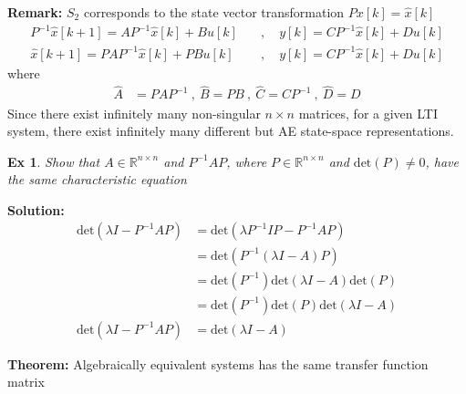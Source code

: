 \documentclass[twoside]{article}
\newtheorem{exmp}[theorem]{Ex}
\begin{document}
\textbf{Remark:} $S_2$ corresponds to the state vector transformation $ P x[k] = \hat{x}[k]$
%
\begin{align*}
  P^{-1} \hat{x}[k+1] = A P^{-1} \hat{x}[k] + B u[k] 
\quad &, \quad y[k] = C P^{-1} \hat{x}[k] + D u[k]
\\
  \hat{x}[k+1] = P A P^{-1} \hat{x}[k] + P B u[k] 
\quad &, \quad y[k] = C P^{-1} \hat{x}[k] + D u[k]
\end{align*}
%
where
%
\begin{align*}
\hat{A} &= P  A P^{-1} \ , \ \hat{B} = P  B \ , \ \hat{C} = C P^{-1} \ ,   \ \hat{D} = D
\end{align*}
%
Since there exist infinitely many non-singular $n \times n$
matrices, for a given LTI system, there exist infinitely 
many different but AE  state-space representations.

\vspace{12pt}

\begin{exmp}
Show that $A \in \mathbb{R}^{n \times n}$ and $P^{-1} A P$, where $P \in \mathbb{R}^{n \times n}$ and $\mathrm{det}(P) \neq 0$, have the same characteristic equation
\end{exmp}

\textbf{Solution:} 
\begin{align*}
  \mathrm{det}\left(\lambda I - P^{-1} A P \right) &= 
\mathrm{det}\left( \lambda P^{-1} I P - P^{-1} A P \right)
\\
&= \mathrm{det} \left( P^{-1} \left( \lambda I - A \right) P \right)
\\
&= \mathrm{det} \left( P^{-1} \right)
\mathrm{det} \left( \lambda I - A \right) 
\mathrm{det} \left( P \right)
\\
&= \mathrm{det} \left( P^{-1} \right) \mathrm{det} \left( P \right)
\mathrm{det} \left( \lambda I - A \right) 
\\
\mathrm{det}\left(\lambda I - P^{-1} A P \right) &= \mathrm{det} \left( \lambda I - A \right) 
\end{align*}

\textbf{Theorem:} Algebraically equivalent systems has the same transfer function matrix
\end{document}
